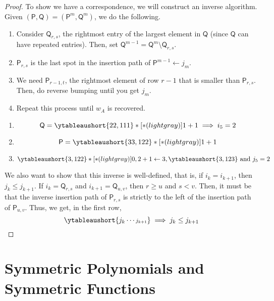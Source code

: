 \documentclass[11pt,leqno,oneside]{amsart}
\numberwithin{thm}{section}
\newcommand{\TP}{\mathsf{P}}
\newcommand{\TQ}{\mathsf{Q}}
\begin{document}
\begin{proof}
  To show we have a correspondence, we will construct an inverse
  algorithm. Given \((\TP, \TQ) = (\TP^m, \TQ^m)\), we do the
  following.
  \begin{enumerate}[label=(\arabic*)]
  \item Consider \(\TQ_{r,s}\), the rightmost entry of the largest
    element in \(\TQ\) (since \(\TQ\) can have repeated entries). Then,
    set \(\TQ^{m-1} = \TQ^m \setminus \TQ_{r,s}\).
  \item \(\TP_{r,s}\) is the last spot in the insertion path of
    \(\TP^{m-1} \leftarrow j_m\).
  \item We need \(\TP_{r-1,t}\), the rightmost element of row \(r-1\)
    that is smaller than \(\TP_{r,s}\). Then, do reverse bumping until
    you get \(j_m\).
  \item Repeat this process until \(w_A\) is recovered.
  \end{enumerate}
  \begin{example}
    \begin{enumerate}
    \item     \[
      \TQ = \ytableaushort{22,111}*[*(lightgray)]{1+1} \implies i_5 = 2
    \]
    \item \[
      \TP = \ytableaushort{33,122}*[*(lightgray)]{1+1}
    \]
  \item \[
      \ytableaushort{3,122}*[*(lightgray)]{0,2+1} \leftarrow 3,
      \ytableaushort{3,123} \text{ and } j_5 = 2
    \]
    \end{enumerate}
  \end{example}
  We also want to show that this inverse is well-defined, that is, if
  \(i_k = i_{k+1}\), then \(j_k \leq j_{k+1}\). If \(i_k = \TQ_{r,s}\)
  and \(i_{k+1} = \TQ_{u,v}\), then \(r \geq u\) and \(s < v\). Then,
  it must be that the inverse insertion path of \(\TP_{r,s}\) is
  strictly to the left of the insertion path of \(\TP_{u,v}\). Thus,
  we get, in the first row, \[
\ytableaushort{{j_k}\cdots{\scriptstyle j_{k+1}}} \implies j_k \leq j_{k+1}
  \]
\end{proof}
\section{Symmetric Polynomials and Symmetric Functions}
\end{document}
